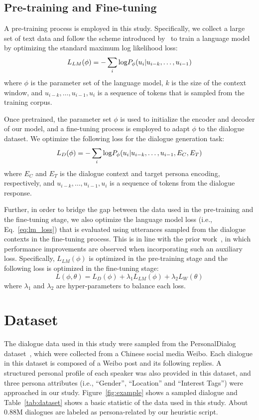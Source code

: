 \documentclass[letterpaper]{article} %
\newcommand{\citep}{\cite}
\begin{document}
\subsection{Pre-training and Fine-tuning}
A pre-training process is employed in this study. Specifically, we collect a large set of text data and follow the scheme introduced by~\citep{radford2018improving} to train a language model by optimizing the standard maximum log likelihood loss:
\begin{equation}\label{eq:lm_loss}
    L_{LM}(\phi) = -\sum_i {\rm log}P_\phi(u_i | u_{i-k}, \dots, u_{i-1})
\end{equation}
where $\phi$ is the parameter set of the language model, $k$ is the size of the context window, and $u_{i-k}, \dots, u_{i-1}, u_i$ is a sequence of tokens that is sampled from the training corpus.

Once pretrained, the parameter set $\phi$ is used to initialize the encoder and decoder of our model, and a fine-tuning process is employed to adapt $\phi$ to the dialogue dataset. We optimize the following loss for the dialogue generation task:
\begin{equation}
    L_{D}(\phi) = -\sum_i {\rm log}P_\phi(u_i | u_{i-k}, \dots, u_{i-1}, E_C, E_T)
\end{equation}
where $E_C$ and $E_T$ is the dialogue context and target persona encoding, respectively, and $u_{i-k}, \dots, u_{i-1}, u_i$ is a sequence of tokens from the dialogue response.

Further, in order to bridge the gap between the data used in the pre-training and the fine-tuning stage, we also optimize the language model loss (i.e., Eq.~\ref{eq:lm_loss}) that is evaluated using utterances sampled from the dialogue contexts in the fine-tuning process. This is in line with the prior work~\citep{radford2018improving}, in which performance improvements are observed when incorporating such an auxiliary loss.
Specifically, $L_{LM}(\phi)$ is optimized in the pre-training stage and the following loss is optimized in the fine-tuning stage:
\begin{equation}\label{eq:total_loss}
    L(\phi, \theta) = L_{D}(\phi) + \lambda_1 L_{LM}(\phi) + \lambda_2 L_{W}(\theta)
\end{equation}
where $\lambda_1$ and $\lambda_2$ are hyper-parameters to balance each loss.

\section{Dataset}
The dialogue data used in this study were sampled from the PersonalDialog dataset~\citep{zheng2019Personal}, which were collected from a Chinese social media Weibo. Each dialogue in this dataset is composed of a Weibo post and its following replies. A structured personal profile of each speaker was also provided in this dataset, and three persona attributes (i.e., ``Gender'', ``Location'' and ``Interest Tags'') were approached in our study. Figure~\ref{fig:example} shows a sampled dialogue and Table~\ref{tab:dataset} shows a basic statistic of the data used in this study. About 0.88M dialogues are labeled as persona-related by our heuristic script.
\end{document}
